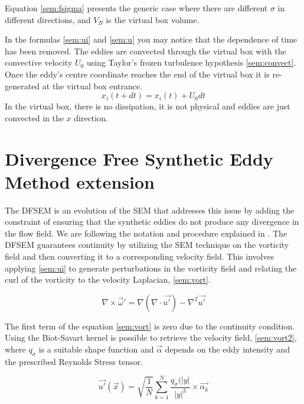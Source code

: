 \documentclass{juliacon}
\begin{document}
Equation \eqref{sem:fsigma} presents the generic case where there are different $\sigma$ in different directions, and $V_B$ is the virtual box volume.

In the formulas \eqref{sem:ui} and \eqref{sem:u} you may notice that the dependence of time has been removed. The eddies are convected through the virtual box with the convective velocity $U_0$ using Taylor’s frozen  turbulence hypothesis \ref{sem:convect}. Once the eddy's centre coordinate reaches the end of the virtual box it is re-generated at the virtual box entrance.
\begin{equation}
    x_i(t+dt)=x_i(t)+U_0 dt
    \label{sem:convect}
\end{equation}
In the virtual box, there is no dissipation, it is not physical and eddies are just convected in the $x$ direction.

\section{Divergence Free Synthetic Eddy Method extension}
The DFSEM is an evolution of the SEM that addresses this issue by adding the constraint of ensuring that the synthetic eddies do not produce any divergence in the flow field. We are following the notation and procedure explained in \cite{Polettoreport}. The DFSEM guarantees continuity by utilizing the SEM technique on the vorticity field and then converting it to a corresponding velocity field. This involves applying \eqref{sem:ui} to generate perturbations in the vorticity field and relating the curl of the vorticity to the velocity Laplacian, \eqref{sem:vort}.

\begin{equation}
    \nabla \times \Vec{\omega}'  = \nabla(\nabla\cdot \Vec{u'}) - \nabla ^2 \Vec{u'}
    \label{sem:vort}
\end{equation}

The first term of the equation \eqref{sem:vort} is zero due to the continuity condition. Using the Biot-Savart kernel is possible to retrieve the velocity field, \eqref{sem:vort2}, where $q_\sigma$ is a suitable shape function and $\Vec{\alpha}$ depends on the eddy intensity and the prescribed Reynolds Stress tensor.

\begin{equation}
\Vec{u'}(\Vec{x}) =  \sqrt{\dfrac{1}{N}} \sum_{k=1}^N \dfrac{q_\sigma(|y|}{|y|^3} \times \Vec{\alpha_k}
    \label{sem:vort2}
\end{equation}
\end{document}
